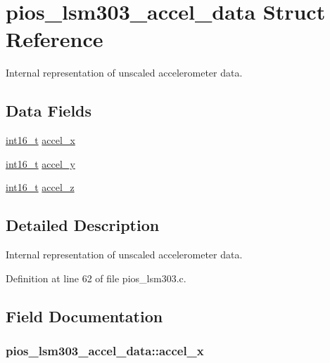 \hypertarget{structpios__lsm303__accel__data}{\section{pios\-\_\-lsm303\-\_\-accel\-\_\-data Struct Reference}
\label{structpios__lsm303__accel__data}
}


Internal representation of unscaled accelerometer data.  


\subsection*{Data Fields}
\begin{DoxyCompactItemize}
\item 
\hyperlink{stdint_8h_aa343fa3b3d06292b959ffdd4c4703b06}{int16\-\_\-t} \hyperlink{structpios__lsm303__accel__data_aec4209992177ea4a76d150164ab90f9e}{accel\-\_\-x}
\item 
\hyperlink{stdint_8h_aa343fa3b3d06292b959ffdd4c4703b06}{int16\-\_\-t} \hyperlink{structpios__lsm303__accel__data_a7ffd1885ce614cf3163ee96ef56ace76}{accel\-\_\-y}
\item 
\hyperlink{stdint_8h_aa343fa3b3d06292b959ffdd4c4703b06}{int16\-\_\-t} \hyperlink{structpios__lsm303__accel__data_a426a988b03d546ea4036551041bf00d1}{accel\-\_\-z}
\end{DoxyCompactItemize}


\subsection{Detailed Description}
Internal representation of unscaled accelerometer data. 

Definition at line 62 of file pios\-\_\-lsm303.\-c.



\subsection{Field Documentation}
\hypertarget{structpios__lsm303__accel__data_aec4209992177ea4a76d150164ab90f9e}{
\subsubsection[{accel\-\_\-x}]{ pios\-\_\-lsm303\-\_\-accel\-\_\-data\-::accel\-\_\-x}}\label{structpios__lsm303__accel__data_aec4209992177ea4a76d150164ab90f9e}


